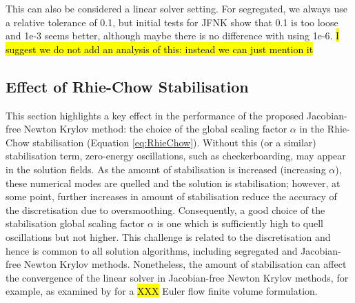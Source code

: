 \documentclass[sn-mathphys,Numbered,draft]{sn-jnl}%
\begin{document}
This can also be considered a linear solver setting. For segregated, we always use a relative tolerance of 0.1, but initial tests for JFNK show that 0.1 is too loose and 1e-3 seems better, although maybe there is no difference with using 1e-6.
\hl{I suggest we do not add an analysis of this: instead we can just mention it}



\subsection{Effect of Rhie-Chow Stabilisation}
This section highlights a key effect in the performance of the proposed Jacobian-free Newton Krylov method: the choice of the global scaling factor $\alpha$ in the Rhie-Chow stabilisation (Equation \ref{eq:RhieChow}).
Without this (or a similar) stabilisation term, zero-energy oscillations, such as checkerboarding, may appear in the solution fields.
As the amount of stabilisation is increased (increasing $\alpha$), these numerical modes are quelled and the solution is stabilisation; however, at some point, further increases in amount of stabilisation reduce the accuracy of the discretisation due to oversmoothing.
Consequently, a good choice of the stabilisation global scaling factor $\alpha$ is one which is sufficiently high to quell oscillations but not higher.
This challenge is related to the discretisation and hence is common to all solution algorithms, including segregated and Jacobian-free Newton Krylov methods.
Nonetheless, the amount of stabilisation can affect the convergence of the linear solver in Jacobian-free Newton Krylov methods, for example, as examined by \citet{Nishikawa} for a \hl{XXX} Euler flow finite volume formulation.
\end{document}
